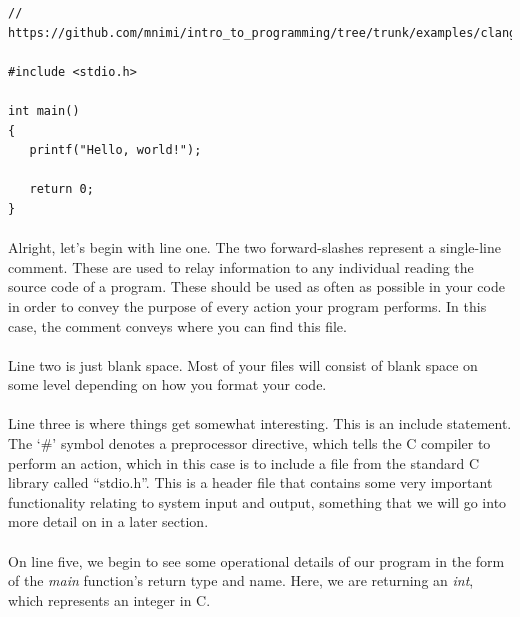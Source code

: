 \newpage

\begin{lstlisting}
// https://github.com/mnimi/intro_to_programming/tree/trunk/examples/clang/hello_world/main.c

#include <stdio.h>

int main()
{
   printf("Hello, world!");

   return 0;
}
\end{lstlisting}

\paragraph{}
   Alright, let's begin with line one. The two forward-slashes represent a single-line comment. These are used to relay information to any individual
   reading the source code of a program. These should be used as often as possible in your code in order to convey the purpose of every action your
   program performs. In this case, the comment conveys where you can find this file.

\paragraph{}
   Line two is just blank space. Most of your files will consist of blank space on some level depending on how you format your code.

\paragraph{}
   Line three is where things get somewhat interesting. This is an include statement. The `\#' symbol denotes a preprocessor directive, which tells
   the C compiler to perform an action, which in this case is to include a file from the standard C library called ``stdio.h''. This is a header file
   that contains some very important functionality relating to system input and output, something that we will go into more detail on in a later
   section.

\paragraph{}
   On line five, we begin to see some operational details of our program in the form of the \textit{main} function's return type and name. Here, we
   are returning an \textit{int}, which represents an integer in C.

